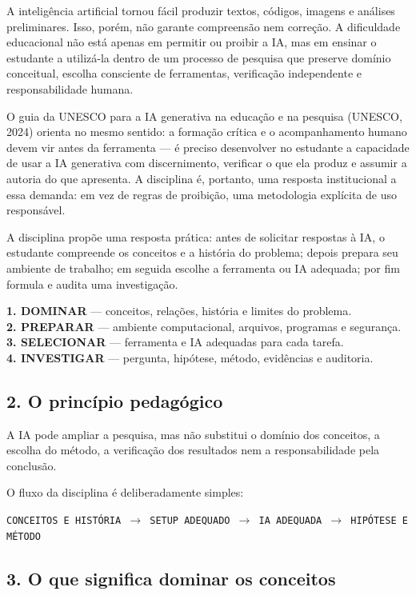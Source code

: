 \documentclass[11pt,a4paper]{article}
\newcommand{\fluxo}{\par\smallskip\noindent\texttt{CONCEITOS E HISTÓRIA $\rightarrow$ SETUP ADEQUADO $\rightarrow$ IA ADEQUADA $\rightarrow$ HIPÓTESE E MÉTODO}\par\smallskip}
\begin{document}
A inteligência artificial tornou fácil produzir textos, códigos, imagens e análises
preliminares. Isso, porém, não garante compreensão nem correção. A dificuldade educacional
não está apenas em permitir ou proibir a IA, mas em ensinar o estudante a utilizá-la dentro
de um processo de pesquisa que preserve domínio conceitual, escolha consciente de ferramentas,
verificação independente e responsabilidade humana.

O guia da UNESCO para a IA generativa na educação e na pesquisa (UNESCO, 2024) orienta no
mesmo sentido: a formação crítica e o acompanhamento humano devem vir antes da ferramenta ---
é preciso desenvolver no estudante a capacidade de usar a IA generativa com discernimento,
verificar o que ela produz e assumir a autoria do que apresenta. A disciplina é, portanto,
uma resposta institucional a essa demanda: em vez de regras de proibição, uma metodologia
explícita de uso responsável.

A disciplina propõe uma resposta prática: antes de solicitar respostas à IA, o estudante
compreende os conceitos e a história do problema; depois prepara seu ambiente de trabalho;
em seguida escolhe a ferramenta ou IA adequada; por fim formula e audita uma investigação.

{\small
\textbf{1. DOMINAR} --- conceitos, relações, história e limites do problema.\\
\textbf{2. PREPARAR} --- ambiente computacional, arquivos, programas e segurança.\\
\textbf{3. SELECIONAR} --- ferramenta e IA adequadas para cada tarefa.\\
\textbf{4. INVESTIGAR} --- pergunta, hipótese, método, evidências e auditoria.
}

\subsection*{2. O princípio pedagógico}

A IA pode ampliar a pesquisa, mas não substitui o domínio dos conceitos, a escolha do
método, a verificação dos resultados nem a responsabilidade pela conclusão.

O fluxo da disciplina é deliberadamente simples:

\fluxo

\subsection*{3. O que significa dominar os conceitos}
\end{document}
